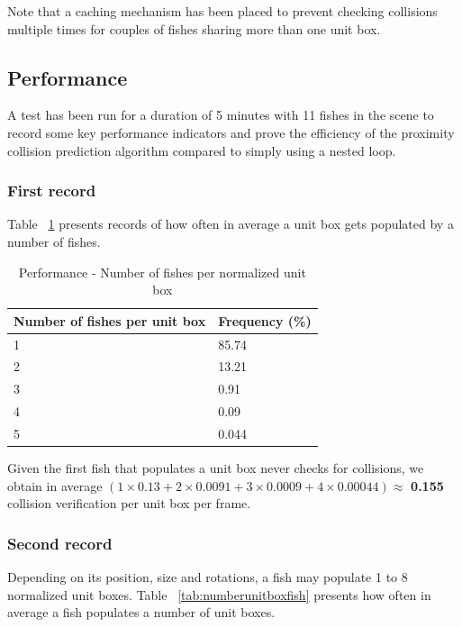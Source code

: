 Note that a caching mechanism has been placed to prevent checking collisions multiple times for couples of fishes sharing more than one unit box.\\

\subsection{Performance}
\label{subsec:performancerec}

A test has been run for a duration of 5 minutes with 11 fishes in the scene to record some key performance indicators and prove the efficiency of the proximity collision prediction algorithm compared to simply using a nested loop.

\subsubsection{First record}

Table ~\ref{tab:numberfishesunitbox} presents records of how often in average a unit box gets populated by a number of fishes.

\begin{table}[H]
\centering
\begin{tabular} { | l | l | }
\hline
\textbf{Number of fishes per unit box} & \textbf{Frequency (\%)} \\
\hline
1 & 85.74 \\
\hline
2 & 13.21 \\
\hline
3 & 0.91 \\
\hline
4 & 0.09 \\
\hline
5 & 0.044 \\
\hline
\end{tabular}
\caption{Performance - Number of fishes per normalized unit box}
\label{tab:numberfishesunitbox}
\end{table}

Given the first fish that populates a unit box never checks for collisions, we obtain in average $(1 \times 0.13 + 2 \times 0.0091 + 3 \times 0.0009 + 4 \times 0.00044) \approx$ \textbf{0.155}  collision verification per unit box per frame.

\subsubsection{Second record}

Depending on its position, size and rotations, a fish may populate 1 to 8 normalized unit boxes. Table ~\ref{tab:numberunitboxfish} presents how often in average a fish populates a number of unit boxes.

